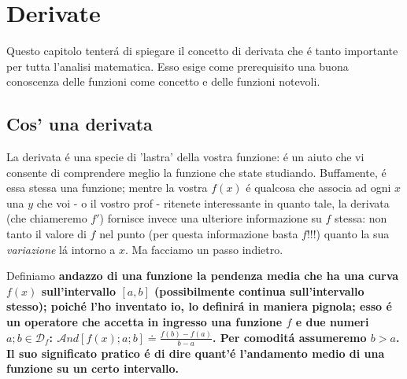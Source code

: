 \label{derivate}
\chapter{Derivate}

Questo capitolo tenter\'a di spiegare il concetto di derivata che \'e tanto importante per tutta l'analisi matematica.
Esso esige come prerequisito una buona conoscenza delle funzioni come concetto e delle funzioni notevoli.

\section{Cos' \egrave una derivata}

La derivata \'e una specie di 'lastra' della vostra funzione: \'e un aiuto che vi consente di comprendere meglio la
funzione che state studiando. Buffamente, \'e essa stessa una funzione; mentre la vostra $f(x)$ \'e qualcosa che associa
ad ogni $x$ una $y$ che voi - o il vostro prof - ritenete interessante in quanto tale, la derivata (che chiameremo $f'$)
fornisce invece una ulteriore informazione su $f$ stessa: non tanto il valore di $f$ nel punto (per questa informazione
basta $f$!!!) quanto la sua {\em variazione} l\'a intorno a $x$. Ma facciamo un passo indietro.


\label{andazzo}
\begin{definizione}[Andazzo] Definiamo \bf{andazzo} di una funzione la pendenza media che ha una curva $f(x)$ sull'intervallo 
      $[a,b]$ (possibilmente continua sull'intervallo stesso); poich\'e l'ho inventato io, lo definir\'a in maniera pignola; esso
      \'e un operatore che accetta in ingresso una funzione $f$ e due numeri $a;b \in \mathcal{D}_f$: $\mathcal{A}nd[f(x);a;b] \doteq \frac{f(b)-f(a)}{b-a}$.
      Per comodit\'a assumeremo $b>a$. Il suo significato pratico \'e di dire quant'\'e
       l'andamento medio di una funzione su un certo intervallo.
\end{definizione}


